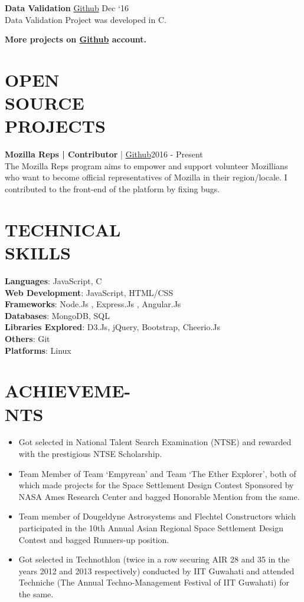 \documentclass[margin]{res}
\begin{document}
\begin{resume}
  {\textbf{Data Validation}} \href{https://github.com/karanagarwal17/Data-Validation}{Github} \hfill Dec `16\\
  Data Validation Project was developed in C.

  \textbf{More projects on \href{https://github.com/karanagarwal17}{Github} account.}

  \section{OPEN \\SOURCE \\ PROJECTS}

      \textbf{Mozilla Reps |  Contributor}  | \href{https://github.com/mozilla/remo/pulls/karanagarwal17}{ Github}\hfill 2016 - Present \\
      The Mozilla Reps program aims to empower and support volunteer Mozillians who want to become official representatives of Mozilla in their region/locale. I contributed to the front-end of the platform by fixing bugs.

\section{TECHNICAL \\ SKILLS}
  {\textbf{Languages}:} JavaScript, C\\
	{\textbf{Web Development}:} JavaScript, HTML/CSS\\
  {\textbf{Frameworks}:} Node.Js , Express.Js , Angular.Js\\
  {\textbf{Databases}:} MongoDB, SQL\\
  {\textbf{Libraries Explored}:} D3.Js, jQuery, Bootstrap, Cheerio.Js\\
  {\textbf{Others}:} Git\\
  {\textbf{Platforms}:} Linux

  \section{ACHIEVEME-\\NTS}
  \begin{itemize}  \itemsep -2pt %
      \item Got selected in National Talent Search Examination (NTSE) and rewarded with the prestigious NTSE Scholarship.
      \item Team Member of Team ‘Empyrean’ and Team ‘The Ether Explorer’, both of which made projects for the Space Settlement Design Contest Sponsored by NASA Ames Research Center and bagged Honorable Mention from the same.
      \item Team member of Dougeldyne Astrosystems and Flechtel Constructors which participated in the 10th Annual Asian Regional Space Settlement Design\\ Contest and bagged Runners-up position.
      \item Got selected in Technothlon (twice in a row securing AIR 28 and 35 in the years 2012 and 2013 respectively) conducted by IIT Guwahati and attended Techniche (The Annual Techno-Management Festival of IIT Guwahati) for the same.
  \end{itemize}


\end{resume}
\end{document}
